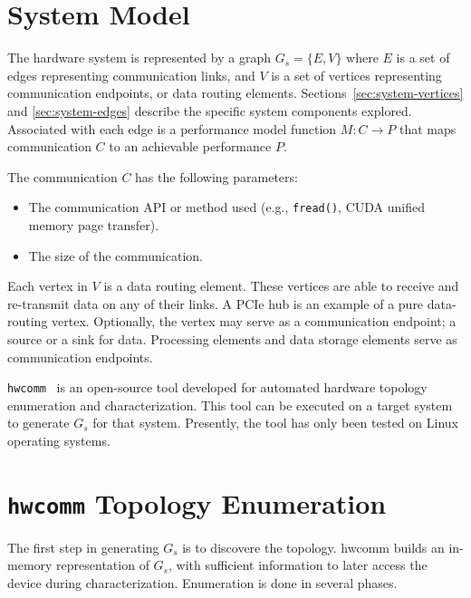 \section{System Model}
\label{sec:system-model}

The hardware system is represented by a graph $G_s = \{E,V\}$ where $E$ is a set of edges representing communication links, and $V$ is a set of vertices representing communication endpoints, or data routing elements.
Sections~\ref{sec:system-vertices} and \ref{sec:system-edges} describe the specific system components explored.
Associated with each edge is a performance model function $M: C \rightarrow P$ that maps communication $C$ to an achievable performance $P$.

The communication $C$ has the following parameters:
\begin{itemize}
    \item The communication API or method used (e.g., \texttt{fread()}, CUDA unified memory page transfer).
    \item The size of the communication.
\end{itemize}


Each vertex in $V$ is a data routing element.
These vertices are able to receive and re-transmit data on any of their links.
A PCIe hub  is an example of a pure data-routing vertex.
Optionally, the vertex may serve as a communication endpoint; a source or a sink for data.
Processing elements and data storage elements serve as communication endpoints.


\texttt{hwcomm}~\cite{pearson2018hwcomm} is an open-source tool developed for automated hardware topology enumeration and characterization.
This tool can be executed on a target system to generate $G_s$ for that system.
Presently, the tool has only been tested on Linux operating systems.



%
%
\section{\texttt{hwcomm} Topology Enumeration}
\label{sec:topology-exploration}

The first step in generating $G_s$ is to discovere the topology.
hwcomm builds an in-memory representation of $G_s$, with sufficient information to later access the device during characterization.
Enumeration is done in several phases.

